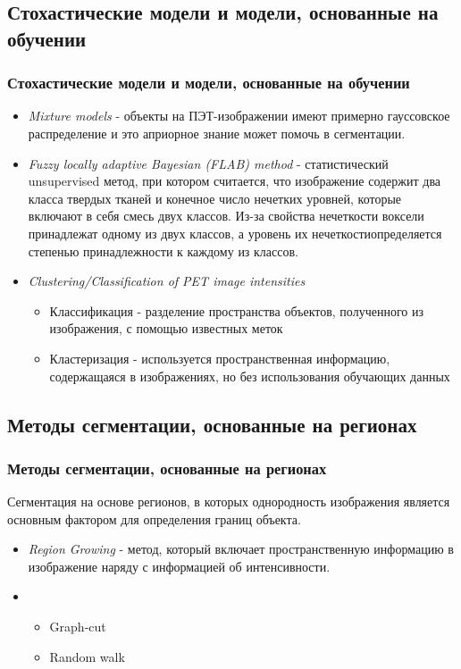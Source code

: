 \subsection{Стохастические модели и модели, основанные на обучении}
\begin{frame}
    \frametitle{Стохастические модели и модели, основанные на обучении}
    \begin{itemize}
        \item \textit{Mixture models} - объекты на ПЭТ-изображении
        имеют примерно гауссовское распределение и это априорное знание 
        может помочь в сегментации.
        \item \textit{Fuzzy locally adaptive Bayesian (FLAB) method} - статистический
        unsupervised метод, при котором считается, что изображение содержит два класса твердых
        тканей и конечное число \grqq нечетких уровней\glqq, которые 
        включают в себя смесь двух классов. Из-за свойства нечеткости 
        воксели принадлежат одному из двух классов, а уровень их 
        \grqq нечеткости\glqq определяется степенью принадлежности к каждому из классов.
        \item \textit{Clustering/Classification of PET image intensities}
        \begin{itemize}
            \item Классификация - разделение пространства объектов, полученного из изображения, с помощью известных меток
            \item Кластеризация - используется пространственная информацию, содержащаяся в изображениях, но без использования обучающих данных
        \end{itemize}
    \end{itemize}
\end{frame}

\subsection{Методы сегментации, основанные на регионах}
\begin{frame}
    \frametitle{Методы сегментации, основанные на регионах}
    Сегментация на основе регионов, в которых однородность 
    изображения является основным фактором для определения 
    границ объекта.
    \begin{itemize}
        \item \textit{Region Growing} - метод, который включает пространственную информацию в изображение наряду с информацией об интенсивности.
        \item {}
        \begin{itemize}
            \item Graph-cut
            \item Random walk

        \end{itemize}
        
    \end{itemize}
    
\end{frame}
